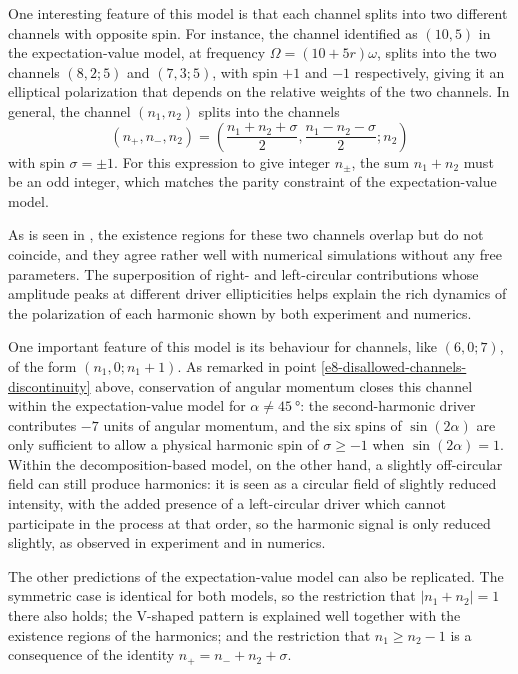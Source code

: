 One interesting feature of this model is that each channel splits into two different channels with opposite spin. For instance, the channel identified as $(10, 5)$ in the expectation-value model, at frequency $\Omega=(10+5r)\omega$, splits into the two channels $(8, 2; 5)$ and $(7, 3; 5)$, with spin $+1$ and $-1$ respectively, giving it an elliptical polarization that depends on the relative weights of the two channels. In general, the channel $(n_1,n_2)$ splits into the \mbox{channels}
\begin{equation}
 (n_+,n_-,n_2)=\left(\frac{n_1+n_2+\sigma}{2},\frac{n_1-n_2-\sigma}{2};n_2\right)
 \label{e8-channel-translation}
\end{equation}
with spin $\sigma=\pm1$. For this expression to give integer $n_\pm$, the sum $n_1+n_2$ must be an odd integer, which matches the parity constraint of the expectation-value model.

As is seen in , the existence regions for these two channels overlap but do not coincide, and they agree rather well with numerical simulations without any free parameters. The superposition of right- and left-circular contributions whose amplitude peaks at different driver ellipticities helps explain the rich dynamics of the polarization of each harmonic shown by both experiment and numerics. 





One important feature of this model is its behaviour for channels, like $(6,0;7)$, of the form $(n_1,0;{n_1+1})$. As remarked in point \ref{e8-disallowed-channels-discontinuity} above, conservation of angular momentum closes this channel within the expectation-value model for $\alpha\neq\SI{45}{\degree}$: the second-harmonic driver contributes $-7$ units of angular momentum, and the six spins of $\sin(2\alpha)$ are only sufficient to allow a physical harmonic spin of $\sigma \geq -1$ when $\sin(2\alpha)=1$. Within the decomposition-based model, on the other hand, a slightly off-circular field can still produce harmonics: it is seen as a circular field of slightly reduced intensity, with the added presence of a left-circular driver which cannot participate in the process at that order, so the harmonic signal is only reduced slightly, as observed in experiment and in numerics.

The other predictions of the expectation-value model can also be replicated. The symmetric case is identical for both models, so the restriction that $|n_1+n_2|=1$ there also holds; the V-shaped pattern is explained well together with the existence regions of the harmonics; and the restriction that $n_1\geq n_2-1$ is a consequence of the identity $n_+=n_- + n_2 + \sigma$.

